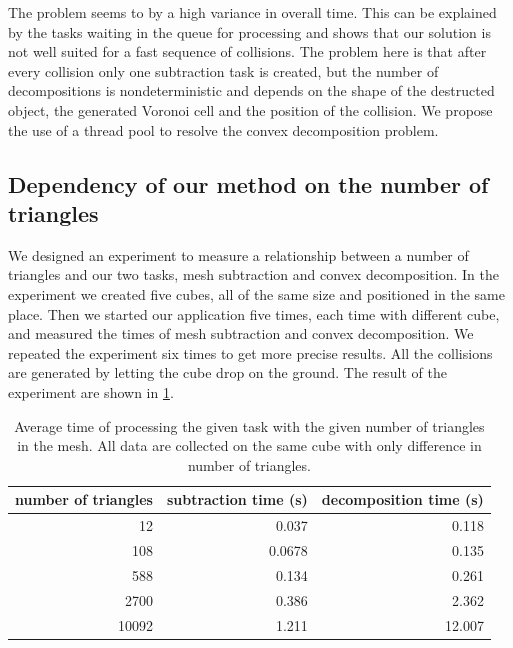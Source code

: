 The problem seems to by a high variance in overall time. This can be explained by the tasks waiting in the queue for processing and shows that our solution is not well suited for a fast sequence of collisions. The problem here is that after every collision only one subtraction task is created, but the number of decompositions is nondeterministic and depends on the shape of the destructed object, the generated Voronoi cell and the position of the collision. We propose the use of a thread pool to resolve the convex decomposition problem.

\subsection{Dependency of our method on the number of triangles}
We designed an experiment to measure a relationship between a number of triangles and our two tasks, mesh subtraction and convex decomposition. In the experiment we created five cubes, all of the same size and positioned in the same place. Then we started our application five times, each time with different cube, and measured the times of mesh subtraction and convex decomposition. We repeated the experiment six times to get more precise results. All the collisions are generated by letting the cube drop on the ground. The result of the experiment are shown in \cref{tab:subtraction-decomposition}. 
\begin{table}
\centering
\begin{tabular}{r|r|r}
number of triangles & subtraction time (s) & decomposition time (s) \\
\hline
12 & 0.037 & 0.118 \\
108 & 0.0678 & 0.135 \\
588 & 0.134 & 0.261 \\ 
2700 & 0.386 & 2.362 \\ 
10092 & 1.211 & 12.007 \\
\end{tabular}
\caption{Average time of processing the given task with the given number of triangles in the mesh. All data are collected on the same cube with only difference in number of triangles.}
\label{tab:subtraction-decomposition}
\end{table}

